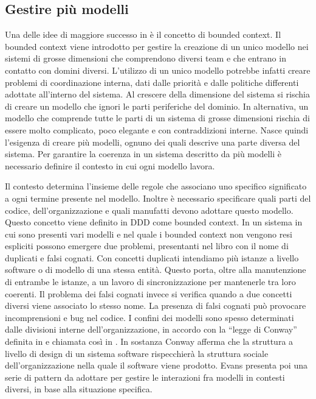 \documentclass[12pt]{report}
\begin{document}
\subsection{Gestire più modelli}   \label{bounded context}
Una delle idee di maggiore successo in \cite{evans_domain-driven_2004} è il concetto di bounded context.
Il bounded context viene introdotto per gestire la creazione di un unico modello nei sistemi di grosse dimensioni che comprendono diversi team e che entrano in contatto con domini diversi.
L'utilizzo di un unico modello potrebbe infatti creare problemi di coordinazione interna, dati dalle priorità e dalle politiche differenti adottate all'interno del sistema.
Al crescere della dimensione del sistema si rischia di creare un modello che ignori le parti periferiche del dominio. 
In alternativa, un modello che comprende tutte le parti di un sistema di grosse dimensioni rischia di essere molto complicato, poco elegante e con contraddizioni interne.
Nasce quindi l'esigenza di creare più modelli, ognuno dei quali descrive una parte diversa del sistema.
Per garantire la coerenza in un sistema descritto da più modelli è necessario definire il contesto in cui ogni modello lavora. 

Il contesto determina l'insieme delle regole che associano uno specifico significato a ogni termine presente nel modello.
Inoltre è necessario specificare quali parti del codice, dell'organizzazione e quali manufatti devono adottare questo modello.
Questo concetto viene definito in DDD come bounded context. 
In un sistema in cui sono presenti vari modelli e nel quale i bounded context non vengono resi espliciti possono emergere due problemi, presentanti nel libro con il nome di duplicati e falsi cognati.
Con concetti duplicati intendiamo più istanze a livello software o di modello di una stessa entità.
Questo porta, oltre alla manutenzione di entrambe le istanze, a un lavoro di sincronizzazione per mantenerle tra loro coerenti.
Il problema dei falsi cognati invece si verifica quando a due concetti diversi viene associato lo stesso nome.
La presenza di falsi cognati può provocare incomprensioni e bug nel codice.    
I confini dei modelli sono spesso determinati dalle divisioni interne dell'organizzazione, in accordo con la ``legge di Conway'' definita in \cite{conway_how_1968} e chiamata così in \cite{brooks_jr_mythical_1974}.
In sostanza Conway afferma che la struttura a livello di design di un sistema software rispecchierà la struttura sociale dell'organizzazione nella quale il software viene prodotto.
Evans presenta poi una serie di pattern da adottare per gestire le interazioni fra modelli in contesti diversi, in base alla situazione specifica.
\end{document}

